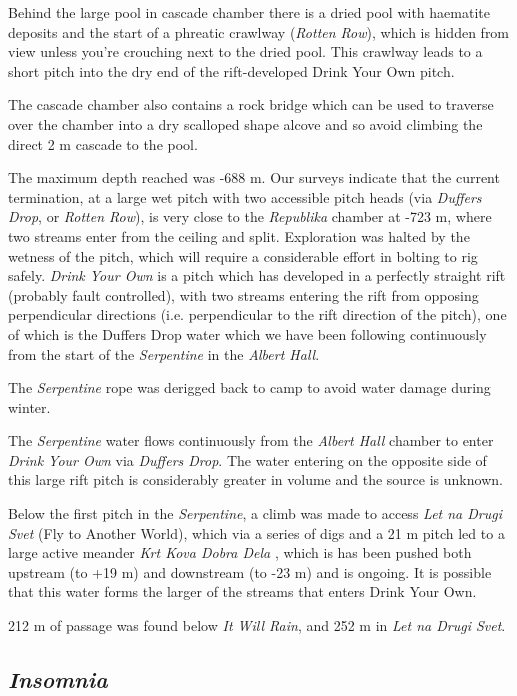 Behind the large pool in cascade chamber there is a dried pool with
haematite deposits and the start of a phreatic crawlway (\emph{Rotten
Row}), which is hidden from view unless you're crouching next to the
dried pool. This crawlway leads to a short pitch into the dry end of the
rift-developed Drink Your Own pitch.

The cascade chamber also contains a rock bridge which can be used to
traverse over the chamber into a dry scalloped shape alcove and so avoid
climbing the direct 2 m cascade to the pool.

The maximum depth reached was -688 m. Our surveys indicate that the
current termination, at a large wet pitch with two accessible pitch
heads (via \emph{Duffers Drop}, or \emph{Rotten Row}), is very close to
the \emph{Republika} chamber at -723 m, where two streams enter from the
ceiling and split. Exploration was halted by the wetness of the pitch,
which will require a considerable effort in bolting to rig safely.
\emph{Drink Your Own} is a pitch which has developed in a perfectly
straight rift (probably fault controlled), with two streams entering the
rift from opposing perpendicular directions (i.e. perpendicular to the
rift direction of the pitch), one of which is the Duffers Drop water
which we have been following continuously from the start of the
\emph{Serpentine} in the \emph{Albert Hall}.

The \emph{Serpentine} rope was derigged back to camp to avoid water
damage during winter.

The \emph{Serpentine} water flows continuously from the \emph{Albert
Hall} chamber to enter \emph{Drink Your Own} via \emph{Duffers Drop}.
The water entering on the opposite side of this large rift pitch is
considerably greater in volume and the source is unknown.

Below the first pitch in the \emph{Serpentine}, a climb was made to
access \emph{Let na Drugi Svet} (Fly to Another World), which via a
series of digs and a 21 m pitch led to a large active meander \emph{Krt
Kova Dobra Dela} , which is has been
pushed both upstream (to +19 m) and downstream (to -23 m) and is
ongoing. It is possible that this water forms the larger of the streams
that enters Drink Your Own.

212 m of passage was found below \emph{It Will Rain}, and 252 m in
\emph{Let na Drugi Svet}.

\hypertarget{insomnia}{%
\subsection{\texorpdfstring{\emph{Insomnia}}{Insomnia}}\label{insomnia}}

